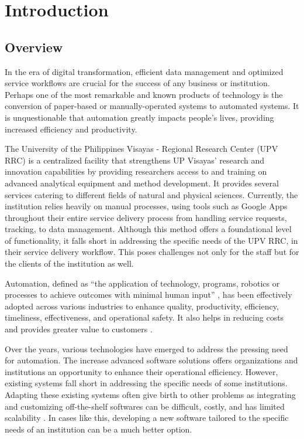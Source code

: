 \chapter{Introduction}
\label{sec:researchdesc}    %

\section{Overview}
\label{sec:overview}

In the era of digital transformation, efficient data management and optimized service workflows are crucial for the success of any business or institution. Perhaps one of the most remarkable and known products of technology is the conversion of paper-based or manually-operated systems to automated systems. It is unquestionable that automation greatly impacts people's lives, providing increased efficiency and productivity.

The University of the Philippines Visayas - Regional Research Center (UPV RRC) is a centralized facility that strengthens UP Visayas’ research and innovation capabilities by providing researchers access to and training on advanced analytical equipment and method development. It provides several services catering to different fields of natural and physical sciences. Currently, the institution relies heavily on manual processes, using tools such as Google Apps throughout their entire service delivery process from handling service requests, tracking, to data management. Although this method offers a foundational level of functionality, it falls short in addressing the specific needs of the UPV RRC, in their service delivery workflow. This poses challenges not only for the staff but for the clients of the institution as well. 

Automation, defined as “the application of technology, programs, robotics or processes to achieve outcomes with minimal human input” \cite{ibm}, has been effectively adopted across various industries to enhance quality, productivity, efficiency, timeliness, effectiveness, and operational safety. It also helps in reducing costs and provides greater value to customers \cite{caban2021}. 

Over the years, various technologies have emerged to address the pressing need for automation. The increase advanced software solutions offers organizations and institutions an opportunity to enhance their operational efficiency. However, existing systems fall short in addressing the specific needs of some institutions. Adapting these existing systems often give birth to other problems as integrating and customizing off-the-shelf softwares can be difficult, costly, and has limited scalability \cite{bitcat2023}. In cases like this, developing a new software tailored to the specific needs of an institution can be a much better option.

